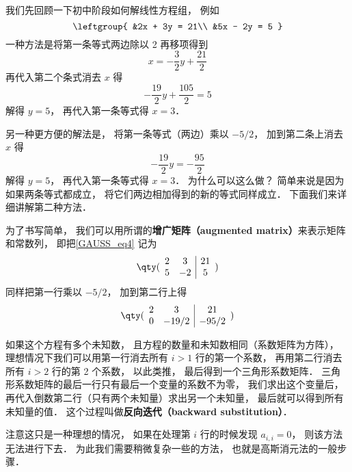 \begin{example}{}\label{GAUSS_ex1}
我们先回顾一下初中阶段如何解线性方程组， 例如
\begin{equation}\label{GAUSS_eq4}
\leftgroup{
&2x + 3y = 21\\
&5x - 2y = 5
}\end{equation}
一种方法是将第一条等式两边除以 2 再移项得到
\begin{equation}
x = - \frac32 y + \frac{21}{2}
\end{equation}
再代入第二个条式消去 $x$ 得
\begin{equation}
-\frac{19}{2} y + \frac{105}{2} = 5
\end{equation}
解得 $y = 5$， 再代入第一条等式得 $x = 3$．

另一种更方便的解法是， 将第一条等式（两边）乘以 $-5/2$， 加到第二条上消去 $x$ 得
\begin{equation}
-\frac{19}{2} y = -\frac{95}{2}
\end{equation}
解得 $y = 5$， 再代入第一条等式得 $x = 3$． 为什么可以这么做？  简单来说是因为如果两条等式都成立， 将它们两边相加得到的新的等式同样成立． 下面我们来详细讲解第二种方法．

为了书写简单， 我们可以用所谓的\textbf{增广矩阵（augmented matrix）}来表示矩阵和常数列， 即把\autoref{GAUSS_eq4} 记为
\begin{equation}
\qty( \begin{array}{cc|c}
	2 & 3 & 21 \\
	5 & -2 & 5
	\end{array} 
)\end{equation}
同样把第一行乘以 $-5/2$， 加到第二行上得
\begin{equation}
\qty( \begin{array}{cc|c}
	2 & 3 & 21 \\
	0 & -19/2 & -95/2
	\end{array} 
)\end{equation}

如果这个方程有多个未知数， 且方程的数量和未知数相同（系数矩阵为方阵）， 理想情况下我们可以用第一行消去所有 $i > 1$ 行的第一个系数， 再用第二行消去所有 $i > 2$ 行的第 2 个系数， 以此类推， 最后得到一个三角形系数矩阵． 三角形系数矩阵的最后一行只有最后一个变量的系数不为零， 我们求出这个变量后， 再代入倒数第二行（只有两个未知量）求出另一个未知量， 最后就可以得到所有未知量的值． 这个过程叫做\textbf{反向迭代（backward substitution）}．%

注意这只是一种理想的情况， 如果在处理第 $i$ 行的时候发现 $a_{i,i} = 0$， 则该方法无法进行下去． 为此我们需要稍微复杂一些的方法， 也就是高斯消元法的一般步骤．
\end{example}

